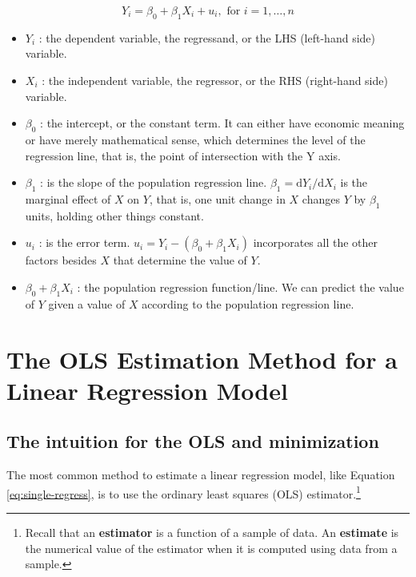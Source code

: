 \documentclass[a4paper,11pt]{article}
\newcommand{\dx}{\mathrm{d}}
\begin{document}
\begin{equation}
\label{eq:single-regress}
Y_i = \beta_0 + \beta_1 X_i + u_i, \text{ for } i = 1, \ldots, n
\end{equation}

\begin{itemize}
\item \(Y_i\) : the dependent variable, the regressand, or the LHS
(left-hand side) variable.
\item \(X_i\) : the independent variable, the regressor, or the RHS
(right-hand side) variable.
\item \(\beta_{0}\) : the intercept, or the constant term. It can either have
economic meaning or have merely mathematical sense, which determines
the level of the regression line, that is, the point of intersection
with the Y axis.
\item \(\beta_{1}\) : is the slope of the population regression
line. \(\beta_1 = \dx Y_i/\dx X_i\) is the marginal effect of \(X\) on
\(Y\), that is, one unit change in \(X\) changes \(Y\) by \(\beta_{\text{1}}\) units,
holding other things constant.
\item \(u_i\) : is the error term. \(u_i = Y_i - (\beta_0 + \beta_1 X_i)\)
incorporates all the other factors besides \(X\) that determine the
value of \(Y\).
\item \(\beta_{0} + \beta_{1}X_{i}\) : the population regression
function/line. We can predict the value of \(Y\) given a value of \(X\)
according to the population regression line.
\end{itemize}



\section{The OLS Estimation Method for a Linear Regression Model}
\label{sec:org68288b2}
\subsection{The intuition for the OLS and minimization}
\label{sec:org2a189cc}
The most common method to estimate a linear regression model, like
Equation \ref{eq:single-regress}, is to use the ordinary least squares (OLS)
estimator.\footnote{Recall that an \textbf{estimator} is a function of a sample of
data. An \textbf{estimate} is the numerical value of the estimator when it is
computed using data from a sample.}
\end{document}
